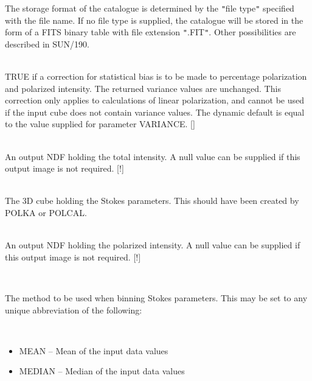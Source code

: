 \documentclass[twoside,11pt]{article}
\newcommand{\htmlref}[2]{#1}
\newcommand{\xref}[3]{#1}
\renewcommand{\_}{\texttt{\symbol{95}}}
\newcommand{\sstsubsection}[1]{ \item[{#1}] \mbox{} \\}
\newcommand{\sstitemlist}[1]{
  \mbox{} \\
  \vspace{-3.5ex}
  \begin{itemize}
     #1
  \end{itemize}
}
\newcommand{\sstitem}{\item}
\newcommand{\sstsubsection}[1]{\item[{#1}]}
\newcommand{\sstitemlist}[1]{
      \begin{itemize}
         #1
      \end{itemize}
      \\
   }
\newcommand{\sstitem}{\item}
\begin{document}
{{{         The storage format of the catalogue is determined by the {\tt "}file
         type{\tt "} specified with the file name. If no file type is supplied,
         the catalogue will be stored in the form of a FITS binary table
         with file extension {\tt "}.FIT{\tt "}. Other possibilities are described in
         \xref{SUN/190}{sun190}{}.
      }
      \sstsubsection{
         DEBIAS = \_LOGICAL (Read)
      }{
         TRUE if a correction for statistical bias is to be made to
         percentage polarization and polarized intensity. The returned
         variance values are unchanged. This correction only applies to
         calculations of linear polarization, and cannot be used if the
         input cube does not contain variance values. The dynamic default
         is equal to the value supplied for parameter VARIANCE. []
      }
      \sstsubsection{
         I = NDF (Write)
      }{
         An output NDF holding the total intensity. A null value can be
         supplied if this output image is not required. [!]
      }
      \sstsubsection{
         IN = NDF (Read)
      }{
         The 3D cube holding the Stokes parameters. This should have been
         created by \htmlref{POLKA}{POLKA} or \htmlref{POLCAL}{POLCAL}.
      }
      \sstsubsection{
         IP = NDF (Write)
      }{
         An output NDF holding the polarized intensity. A null value can be
         supplied if this output image is not required. [!]
      }
      \sstsubsection{
         METHOD = LITERAL (Read)
      }{
         The method to be used when binning Stokes parameters. This may be
         set to any unique abbreviation of the following:
         \sstitemlist{

            \sstitem
               MEAN      -- Mean of the input data values

            \sstitem
               MEDIAN    -- Median of the input data values

}}}}
\end{document}
